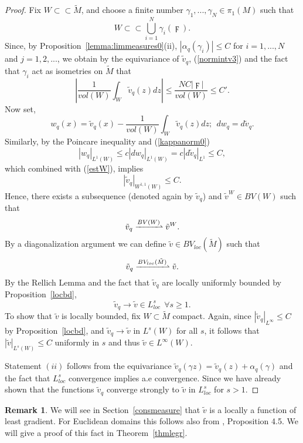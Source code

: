 \documentclass{ip-journal}
\theoremstyle{definition}
\newtheorem{remark}[theorem]{Remark}
\numberwithin{equation}{section}
\begin{document}
\begin{proof} Fix $W \subset  \subset \tilde M$, and choose a finite number $\gamma_1,...,\gamma_N \in \pi_1(M)$ such that
\[
W \subset \subset \bigcup_{i=1}^N \gamma_i(\digamma).
\]
Since, by Proposition~\ref{lemma:limmeasures0}(ii),  $| \alpha_q(\gamma_i)| \leq C$  for $i=1,...,N $ and $j=1,2,...$, we obtain by the equivariance of $\tilde v_q$, (\ref{normintv3})
 and the fact that 
$\gamma_i$ act as isometries on $\tilde M$ that
\begin{equation}\label{estW}
\left| \frac{1}{vol(W)} \int_W \tilde v_q(z)dz \right| \leq  \frac{NC |\digamma|}{vol(W)} \leq C'.
\end{equation}
Now set,
\[
w_q(x)=\tilde v_q( x)- \frac{1}{vol(W)} \int_W \tilde v_q( z)dz; \ \ dw_q=d\tilde v_q.
\]
Similarly, by the Poincare inequality and (\ref{kappanorm0})
\[
|w_q|_{L^1(W)} \leq c |dw_q|_{L^1(W)}= c|d\tilde v_q|_{L^1} \leq C,
\]
which combined with (\ref{estW}), implies
\[
|\tilde v_q|_{W^{1,1}(W)} \leq C.
\]
Hence, there exists a subsequence (denoted again by $\tilde v_q$) and $\tilde v^W \in BV(W)$
such that
\[
\tilde v_q \xrightharpoonup{BV(W)} \tilde v^W.
\]
By a diagonalization argument we can define $\tilde v \in BV_{loc}(\tilde M)$ such that
\[
\tilde v_q \xrightharpoonup{BV_{loc}(\tilde M)} \tilde v.
\]
By the Rellich Lemma and the fact that $\tilde v_q$ are locally uniformly bounded by Proposition~\ref{locbd}, 
\[
\tilde v_q  \rightarrow \tilde v \in L^s_{loc} \ \ \forall s \geq 1.
\]
To show that  $\tilde v$ is locally bounded, fix $W \subset \tilde M$ compact. Again, since   
$|\tilde v_q|_{L^\infty} \leq C$  by Proposition~\ref{locbd}, and  $\tilde v_q  \rightarrow \tilde v$  in $L^s(W)$ for all $s$, it follows that $|\tilde v|_{L^s(W)} \leq C$ uniformly in $s$ and thus $\tilde v \in L^\infty(W)$.

Statement $(ii)$ follows from the equivariance 
$\tilde v_q(\gamma z)=\tilde v_q(z)+ \alpha_q(\gamma)$ 
and the fact that $L^s_{loc}$ convergence implies a.e convergence. 
 Since we have already shown that the functions $\tilde v_q$ converge strongly to $\tilde v$ in $L^s_{loc}$ for $s>1$. 
\end{proof}

\begin{remark} We will see in Section~\ref{consmeasure} that $\tilde v$ is a locally a function of least gradient. For Euclidean domains this follows also from  \cite{juutinen}, Proposition 4.5. We will give a proof of this fact in Theorem~\ref{thmlegr}.
\end{remark}
\end{document}
